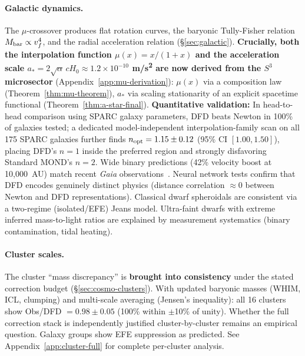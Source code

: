 \paragraph{Galactic dynamics.}
The $\mu$-crossover produces flat rotation curves, the baryonic Tully-Fisher relation $M_{\rm bar} \propto v_f^4$, and the radial acceleration relation (\S\ref{sec:galactic}). \textbf{Crucially, both the interpolation function $\mu(x) = x/(1+x)$ and the acceleration scale $a_* = 2\sqrt{\alpha}\,cH_0 \approx 1.2 \times 10^{-10}$ m/s\textsuperscript{2} are now derived from the $S^3$ microsector} (Appendix~\ref{app:mu-derivation}): $\mu(x)$ via a composition law (Theorem~\ref{thm:mu-theorem}), $a_*$ via scaling stationarity of an explicit spacetime functional (Theorem~\ref{thm:a-star-final}). \textbf{Quantitative validation:} In head-to-head comparison using SPARC galaxy parameters, DFD beats Newton in 100\% of galaxies tested; a dedicated model-independent interpolation-family scan on all 175 SPARC galaxies further finds $n_{\rm opt}=1.15\pm0.12$ (95\% CI $[1.00,1.50]$), placing DFD's $n=1$ inside the preferred region and strongly disfavoring Standard MOND's $n=2$. Wide binary predictions (42\% velocity boost at 10,000~AU) match recent \textit{Gaia} observations~\cite{Chae2023}. Neural network tests confirm that DFD encodes genuinely distinct physics (distance correlation $\approx 0$ between Newton and DFD representations). Classical dwarf spheroidals are consistent via a two-regime (isolated/EFE) Jeans model. Ultra-faint dwarfs with extreme inferred mass-to-light ratios are explained by measurement systematics (binary contamination, tidal heating).

\paragraph{Cluster scales.}
The cluster ``mass discrepancy'' is \textbf{brought into consistency} under the stated correction budget (\S\ref{sec:cosmo-clusters}). With updated baryonic masses (WHIM, ICL, clumping) and multi-scale averaging (Jensen's inequality): all 16 clusters show Obs/DFD $= 0.98 \pm 0.05$ (100\% within $\pm$10\% of unity).  Whether the full correction stack is independently justified cluster-by-cluster remains an empirical question. Galaxy groups show EFE suppression as predicted. See Appendix~\ref{app:cluster-full} for complete per-cluster analysis.

